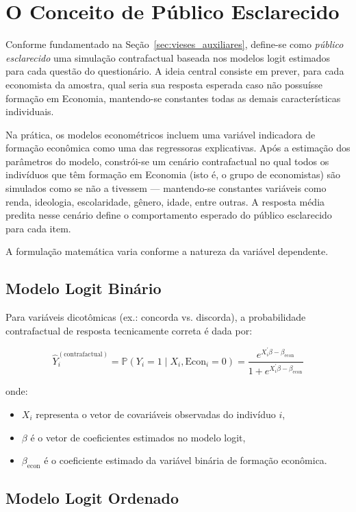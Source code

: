 \section{O Conceito de Público Esclarecido}

Conforme fundamentado na Seção~\ref{sec:vieses_auxiliares}, define-se como \textit{público esclarecido} uma simulação contrafactual baseada nos modelos logit estimados para cada questão do questionário. A ideia central consiste em prever, para cada economista da amostra, qual seria sua resposta esperada caso não possuísse formação em Economia, mantendo-se constantes todas as demais características individuais.

Na prática, os modelos econométricos incluem uma variável indicadora de formação econômica como uma das regressoras explicativas. Após a estimação dos parâmetros do modelo, constrói-se um cenário contrafactual no qual todos os indivíduos que têm formação em Economia (isto é, o grupo de economistas) são simulados como se não a tivessem — mantendo-se constantes variáveis como renda, ideologia, escolaridade, gênero, idade, entre outras. A resposta média predita nesse cenário define o comportamento esperado do público esclarecido para cada item.

A formulação matemática varia conforme a natureza da variável dependente.

\subsection{Modelo Logit Binário}

Para variáveis dicotômicas (ex.: concorda vs. discorda), a probabilidade contrafactual de resposta tecnicamente correta é dada por:

\[
\hat{Y}_i^{(\text{contrafactual})} = \mathbb{P}(Y_i = 1 \mid X_i, \text{Econ}_i = 0) = \frac{e^{X_i^\prime \beta - \beta_{\text{econ}}}}{1 + e^{X_i^\prime \beta - \beta_{\text{econ}}}}
\]

\noindent onde:
\begin{itemize}
  \item \( X_i \) representa o vetor de covariáveis observadas do indivíduo \( i \),
  \item \( \beta \) é o vetor de coeficientes estimados no modelo logit,
  \item \( \beta_{\text{econ}} \) é o coeficiente estimado da variável binária de formação econômica.
\end{itemize}

\subsection{Modelo Logit Ordenado}

